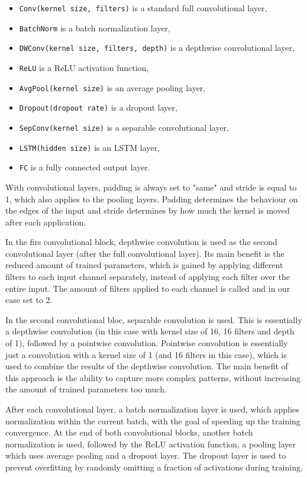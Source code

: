 \documentclass[english, he, bc, kiv, iso690alph]{fasthesis}
\begin{document}
\begin{itemize}
	\item\texttt{Conv(kernel size, filters)} is a standard full convolutional layer,
	\item\texttt{BatchNorm} is a batch normalization layer,
	\item\texttt{DWConv(kernel size, filters, depth)} is a depthwise convolutional layer,
	\item\texttt{ReLU} is a ReLU activation function,
	\item\texttt{AvgPool(kernel size)} is an average pooling layer,
	\item\texttt{Dropout(dropout rate)} is a dropout layer,
	\item\texttt{SepConv(kernel size)} is a separable convolutional layer,
	\item\texttt{LSTM(hidden size)} is an LSTM layer,
	\item\texttt{FC} is a fully connected output layer.
\end{itemize}

With convolutional layers, padding is always set to "same" and stride is equal to 1, which also applies to the pooling layers. Padding determines the behaviour on the edges of the input and stride determines by how much the kernel is moved after each application.

In the firs convolutional block, depthwise convolution is used as the second convolutional layer (after the full convolutional layer). Its main benefit is the reduced amount of trained parameters, which is gained by applying different filters to each input channel separately, instead of applying each filter over the entire input. The amount of filters applied to each channel is called  and in our case set to 2.

In the second convolutional bloc, separable convolution is used. This is essentially a depthwise convolution (in this case with kernel size of 16, 16 filters and depth of 1), followed by a pointwise convolution. Pointwise convolution is essentially just a convolution with a kernel size of 1 (and 16 filters in this case), which is used to combine the results of the depthwise convolution. The main benefit of this approach is the ability to capture more complex patterns, without increasing the amount of trained parameters too much.

After each convolutional layer, a batch normalization layer is used, which applies normalization within the current batch, with the goal of speeding up the training convergence. At the end of both convolutional blocks, another batch normalization is used, followed by the ReLU activation function, a pooling layer which uses average pooling and a dropout layer. The dropout layer is used to prevent overfitting by randomly omitting a fraction of activations during training.
\end{document}

